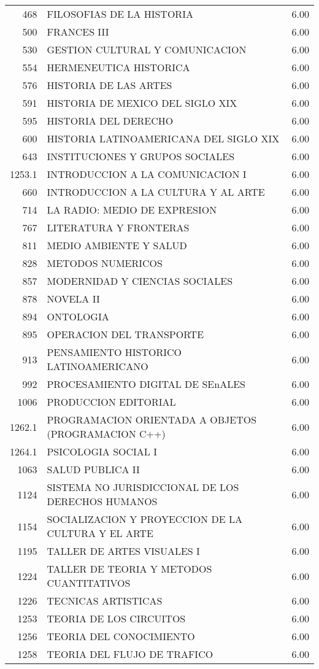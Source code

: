 \documentclass[12pt]{article}
\begin{document}
\begin{table}[ht]
{\begin{tabular}{rlr}
  468 & FILOSOFIAS DE LA HISTORIA & 6.00 \\ 
  500 & FRANCES III & 6.00 \\ 
  530 & GESTION CULTURAL Y COMUNICACION & 6.00 \\ 
  554 & HERMENEUTICA HISTORICA & 6.00 \\ 
  576 & HISTORIA DE LAS ARTES & 6.00 \\ 
  591 & HISTORIA DE MEXICO DEL SIGLO XIX & 6.00 \\ 
  595 & HISTORIA DEL DERECHO & 6.00 \\ 
  600 & HISTORIA LATINOAMERICANA DEL SIGLO XIX & 6.00 \\ 
  643 & INSTITUCIONES Y GRUPOS SOCIALES & 6.00 \\ 
  1253.1 & INTRODUCCION A LA COMUNICACION I & 6.00 \\ 
  660 & INTRODUCCION A LA CULTURA Y AL ARTE & 6.00 \\ 
  714 & LA RADIO: MEDIO DE EXPRESION & 6.00 \\ 
  767 & LITERATURA Y FRONTERAS & 6.00 \\ 
  811 & MEDIO AMBIENTE Y SALUD & 6.00 \\ 
  828 & METODOS NUMERICOS & 6.00 \\ 
  857 & MODERNIDAD Y CIENCIAS SOCIALES & 6.00 \\ 
  878 & NOVELA II & 6.00 \\ 
  894 & ONTOLOGIA & 6.00 \\ 
  895 & OPERACION DEL TRANSPORTE & 6.00 \\ 
  913 & PENSAMIENTO HISTORICO LATINOAMERICANO & 6.00 \\ 
  992 & PROCESAMIENTO DIGITAL DE SEnALES & 6.00 \\ 
  1006 & PRODUCCION EDITORIAL & 6.00 \\ 
  1262.1 & PROGRAMACION ORIENTADA A OBJETOS (PROGRAMACION C++) & 6.00 \\ 
  1264.1 & PSICOLOGIA SOCIAL I & 6.00 \\ 
  1063 & SALUD PUBLICA II & 6.00 \\ 
  1124 & SISTEMA NO JURISDICCIONAL DE LOS DERECHOS HUMANOS & 6.00 \\ 
  1154 & SOCIALIZACION Y PROYECCION DE LA CULTURA Y EL ARTE & 6.00 \\ 
  1195 & TALLER DE ARTES VISUALES I & 6.00 \\ 
  1224 & TALLER DE TEORIA Y METODOS CUANTITATIVOS & 6.00 \\ 
  1226 & TECNICAS ARTISTICAS & 6.00 \\ 
  1253 & TEORIA DE LOS CIRCUITOS & 6.00 \\ 
  1256 & TEORIA DEL CONOCIMIENTO & 6.00 \\ 
  1258 & TEORIA DEL FLUJO DE TRAFICO & 6.00 \\ 
    \hline
\end{tabular}}
\end{table}
\end{document}
